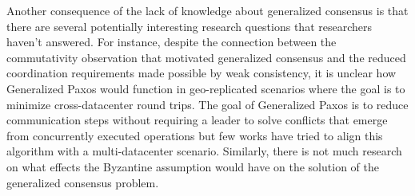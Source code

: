 Another consequence of the lack of knowledge about generalized consensus is that there are several potentially interesting research questions that researchers haven't answered. For instance, despite the connection between the commutativity observation that motivated generalized consensus and the reduced coordination requirements made possible by weak consistency, it is unclear how Generalized Paxos would function in geo-replicated scenarios where the goal is to minimize cross-datacenter round trips. The goal of Generalized Paxos is to reduce communication steps without requiring a leader to solve conflicts that emerge from concurrently executed operations but few works have tried to align this algorithm with a multi-datacenter scenario. Similarly, there is not much research on what effects the Byzantine assumption would have on the solution of the generalized consensus problem.
\par

